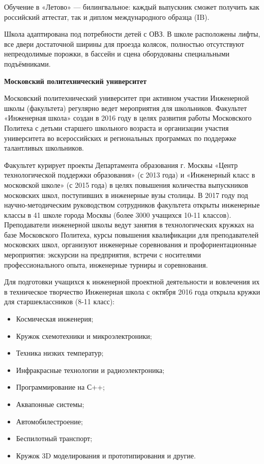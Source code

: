 Обучение в «Летово» — билингвальное: каждый выпускник сможет получить как российский аттестат, так и диплом международного образца (IB).

Школа адаптирована под потребности детей с ОВЗ. В школе расположены лифты, все двери достаточной ширины для проезда колясок, полностью отсутствуют непреодолимые порожки, в бассейн и сцена  оборудованы специальными подъёмниками.

\textbf{Московский политехнический университет}

Московский политехнический университет при активном участии Инженерной школы (факультета) регулярно ведет мероприятия для школьников. Факультет «Инженерная школа» создан в 2016 году в целях развития работы Московского Политеха с детьми старшего школьного возраста и организации участия университета во всероссийских и региональных программах по поддержке талантливых школьников.

Факультет курирует проекты Департамента образования г. Москвы «Центр технологической поддержки образования» (с 2013 года) и «Инженерный класс в московской школе» (с 2015 года) в целях повышения количества выпускников московских школ, поступивших в инженерные вузы столицы. В 2017 году под научно-методическим руководством сотрудников факультета открыты инженерные классы в 41 школе города Москвы (более 3000 учащихся 10-11 классов). Преподаватели инженерной школы ведут занятия в технологических кружках на базе Московского Политеха, курсы повышения квалификации для преподавателей московских школ, организуют инженерные соревнования и профориентационные мероприятия: экскурсии на предприятия, встречи с носителями профессионального опыта, инженерные турниры и соревнования.

Для подготовки учащихся к инженерной проектной деятельности и вовлечения их в техническое творчество Инженерная школа с октября 2016 года открыла кружки для старшеклассников (8-11 класс):
\begin{itemize}
    \item Космическая инженерия;
    \item Кружок схемотехники и микроэлектроники;
    \item Техника низких температур;
    \item Инфракрасные технологии и радиоэлектроника;
    \item Программирование на С++;
    \item Аквапонные системы;
    \item Автомобилестроение;
    \item Беспилотный транспорт;
    \item Кружок 3D моделирования и прототипирования и другие.
\end{itemize}

